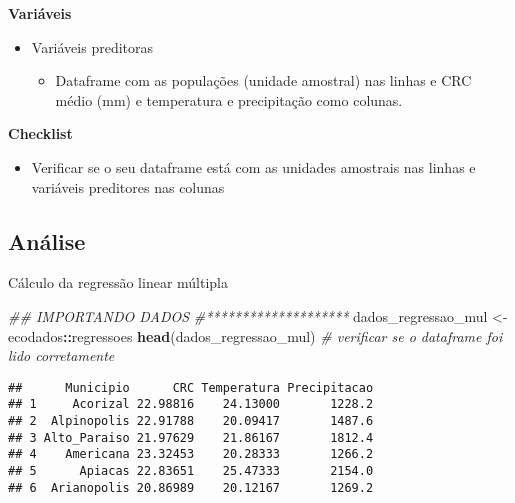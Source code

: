 \documentclass[
]{book}
\newenvironment{Shaded}{\begin{snugshade}}{\end{snugshade}}
\newcommand{\CommentTok}[1]{\textcolor[rgb]{0.56,0.35,0.01}{\textit{#1}}}
\newcommand{\KeywordTok}[1]{\textcolor[rgb]{0.13,0.29,0.53}{\textbf{#1}}}
\newcommand{\NormalTok}[1]{#1}
\newcommand{\OperatorTok}[1]{\textcolor[rgb]{0.81,0.36,0.00}{\textbf{#1}}}
\newcommand{\StringTok}[1]{\textcolor[rgb]{0.31,0.60,0.02}{#1}}
\providecommand{\tightlist}{%
  \setlength{\itemsep}{0pt}\setlength{\parskip}{0pt}}
\begin{document}
\textbf{Variáveis}

\begin{itemize}
\tightlist
\item
  Variáveis preditoras

  \begin{itemize}
  \tightlist
  \item
    Dataframe com as populações (unidade amostral) nas linhas e CRC médio (mm) e temperatura e precipitação como colunas.
  \end{itemize}
\end{itemize}

\textbf{Checklist}

\begin{itemize}
\tightlist
\item
  Verificar se o seu dataframe está com as unidades amostrais nas linhas e variáveis preditores nas colunas
\end{itemize}

\hypertarget{anuxe1lise-5}{%
\subsection{Análise}\label{anuxe1lise-5}}

Cálculo da regressão linear múltipla

\begin{Shaded}
\begin{Highlighting}[]
\CommentTok{## IMPORTANDO DADOS}
\CommentTok{#********************}
\NormalTok{dados_regressao_mul <-}\StringTok{ }\NormalTok{ecodados}\OperatorTok{::}\NormalTok{regressoes}
\KeywordTok{head}\NormalTok{(dados_regressao_mul) }\CommentTok{# verificar se o dataframe foi lido corretamente}
\end{Highlighting}
\end{Shaded}

\begin{verbatim}
##      Municipio      CRC Temperatura Precipitacao
## 1     Acorizal 22.98816    24.13000       1228.2
## 2  Alpinopolis 22.91788    20.09417       1487.6
## 3 Alto_Paraiso 21.97629    21.86167       1812.4
## 4    Americana 23.32453    20.28333       1266.2
## 5      Apiacas 22.83651    25.47333       2154.0
## 6  Arianopolis 20.86989    20.12167       1269.2
\end{verbatim}
\end{document}
